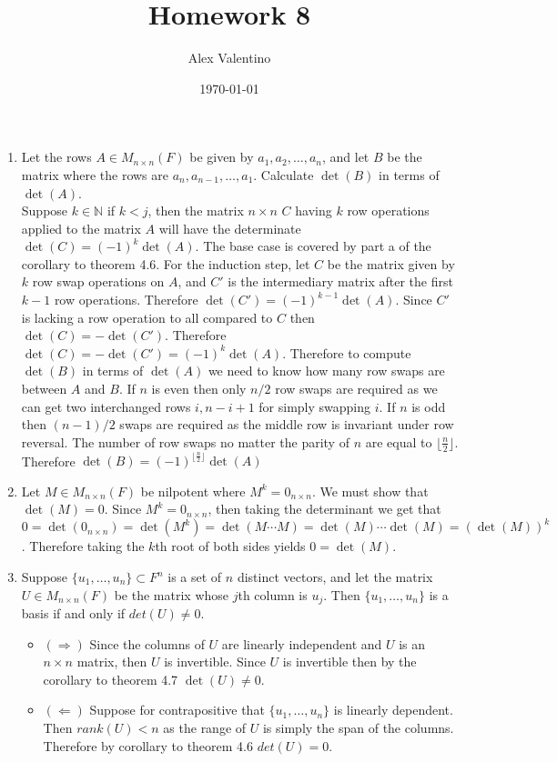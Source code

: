 \documentclass[12pt, letterpaper]{article}
\date{\today}
\author{Alex Valentino}
\title{Homework 8}
\newcommand{\N}{\mathbb{N}}
\begin{document}
\begin{enumerate}
	\item Let the rows $A \in M_{n \times n}(F)$ be given by $a_1,a_2,\ldots,a_n$, and let $B$ be the matrix where the rows are $a_n,a_{n-1},\ldots,a_1$.  Calculate $\det(B)$ in terms of $\det(A)$.  \\
	Suppose $k \in \N$ if $k < j$, then the matrix $n \times n$ $C$ having $k$ row operations applied to the matrix $A$ will have the determinate $\det(C) = (-1)^k \det(A)$.  The base case is covered by part a of the corollary to theorem 4.6.  For the induction step, let $C$ be the matrix given by $k$ row swap operations on $A$, and $C'$ is the intermediary matrix after the first $k-1$ row operations.  Therefore $\det(C') = (-1)^{k-1} \det(A)$.  Since $C'$ is lacking a row operation to all compared to $C$ then $\det(C) = -\det(C')$.  Therefore $\det(C) = -\det(C') = (-1)^k \det(A)$.  Therefore to compute $\det(B)$ in terms of $\det(A)$ we need to know how many row swaps are between $A$ and $B$.  If $n$ is even then only $n/2$ row swaps are required as we can get two interchanged rows $i,n-i+1$ for simply swapping $i$.  If $n$ is odd then $(n-1)/2$ swaps are required as the middle row is invariant under row reversal.  The number of row swaps no matter the parity of $n$ are equal to $\lfloor \frac{n}{2} \rfloor$.  Therefore $\det(B) = (-1)^{\lfloor \frac{n}{2} \rfloor} \det(A)$
	\newpage
	\item Let $M \in M_{n \times n} (F)$ be nilpotent where $M^k = 0_{n \times n}$.  We must show that $\det(M) = 0$.  Since $M^k = 0_{n \times n}$, then taking the determinant we get that $0 = \det(0_{n \times n}) = \det(M^k) = \det(M \cdots M) = \det(M) \cdots \det(M) = (\det(M))^k$.  Therefore taking the $k$th root of both sides yields $0 = \det(M)$.  \\
	\newpage
	\item Suppose $\{u_1,\ldots,u_n\} \subset F^n$ is a set of $n$ distinct vectors, and let the matrix $U\in M_{n \times n}(F)$ be the matrix whose $j$th column is $u_j$.  Then $\{u_1,\ldots,u_n\}$ is a basis if and only if $det(U) \neq 0$.  
	\begin{itemize}
	\item $(\Rightarrow)$ Since the columns of $U$ are linearly independent and $U$ is an $n \times n$ matrix, then $U$ is invertible.  Since $U$ is invertible then by the corollary to theorem 4.7 $\det(U) \neq 0$.  
	\item $(\Leftarrow)$ Suppose for contrapositive that $\{u_1,\ldots,u_n\}$ is linearly dependent.  Then $rank(U) < n$ as the range of $U$ is simply the span of the columns.  Therefore by corollary to theorem 4.6 $det(U)=0$.
	

\end{itemize}
\end{enumerate}
\end{document}
